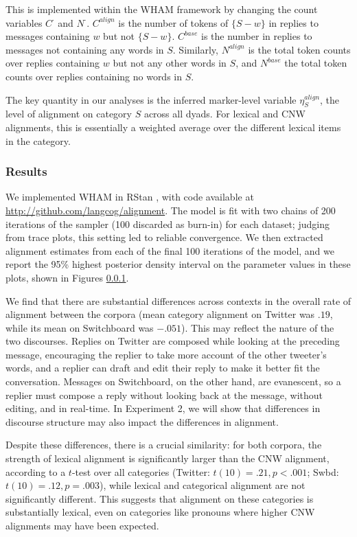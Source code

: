 \documentclass[11pt]{article}
\begin{document}
This is implemented within the WHAM framework by changing the count variables $C^\cdot$ and $N^\cdot$. $C^{align}$ is the number of tokens of $\{S-w\}$ in replies to messages containing $w$ but not $\{S - w\}$. $C^{base}$ is the number in replies to messages not containing any words in $S$.  Similarly, $N^{align}$ is the total token counts over replies containing $w$ but not any other words in $S$, and $N^{base}$ the total token counts over replies containing no words in $S$.

The key quantity in our analyses is the inferred marker-level variable $\eta^{align}_{S}$, the level of alignment on category $S$ across all dyads. For lexical and CNW alignments, this is essentially a weighted average over the different lexical items in the category.

\subsubsection{Results}
We implemented WHAM in RStan \cite{Stan}, with code available at \url{http://github.com/langcog/alignment}. The model is fit with two chains of 200 iterations of the sampler (100 discarded as burn-in) for each dataset; judging from trace plots, this setting led to reliable convergence.  We then extracted alignment estimates from each of the final 100 iterations of the model, and we report the 95\% highest posterior density interval on the parameter values in these plots, shown in Figures \ref{}.

We find that there are substantial differences across contexts in the overall rate of alignment between the corpora (mean category alignment on Twitter was $.19$, while its mean on Switchboard was $-.051$). This may reflect the nature of the two discourses. Replies on Twitter are composed while looking at the preceding message, encouraging the replier to take more account of the other tweeter's words, and a replier can draft and edit their reply to make it better fit the conversation.  Messages on Switchboard, on the other hand, are evanescent, so a replier must compose a reply without looking back at the message, without editing, and in real-time.  In Experiment 2, we will show that differences in discourse structure may also impact the differences in alignment.

Despite these differences, there is a crucial similarity: for both corpora, the strength of lexical alignment is significantly larger than the CNW alignment, according to a $t$-test over all categories (Twitter: $t(10)=.21, p<.001$; Swbd: $t(10)=.12,p=.003$), while lexical and categorical alignment are not significantly different. This suggests that alignment on these categories is substantially lexical, even on categories like pronouns where higher CNW alignments may have been expected.
\end{document}
